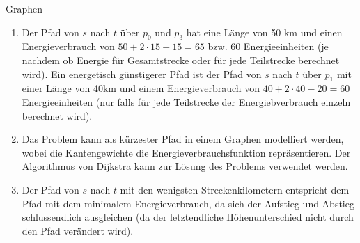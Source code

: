 \documentclass{article}
\begin{document}
\begin{exercise}{Graphen}
  \begin{solution}
    \begin{enumerate}
      \item Der Pfad von $s$ nach $t$ über $p_0$ und $p_3$ hat eine Länge von 50 km und einen Energieverbrauch von $50+2\cdot 15-15=65$ bzw. 60 Energieeinheiten (je nachdem ob Energie für Gesamtstrecke oder für jede Teilstrecke berechnet wird). Ein energetisch günstigerer Pfad ist der Pfad von $s$ nach $t$ über $p_1$ mit einer Länge von 40km und einem Energieverbrauch von $40+2\cdot 40-20=60$ Energieeinheiten (nur falls für jede Teilstrecke der Energiebverbrauch einzeln berechnet wird).
      \item Das Problem kann als kürzester Pfad in einem Graphen modelliert werden, wobei die Kantengewichte die Energieverbrauchsfunktion repräsentieren. Der Algorithmus von Dijkstra kann zur Lösung des Problems verwendet werden.
      \item Der Pfad von $s$ nach $t$ mit den wenigsten Streckenkilometern entspricht dem Pfad mit dem minimalem Energieverbrauch, da sich der Aufstieg und Abstieg schlussendlich ausgleichen (da der letztendliche Höhenunterschied nicht durch den Pfad verändert wird).
    \end{enumerate}
  \end{solution}
\end{exercise}
\end{document}
